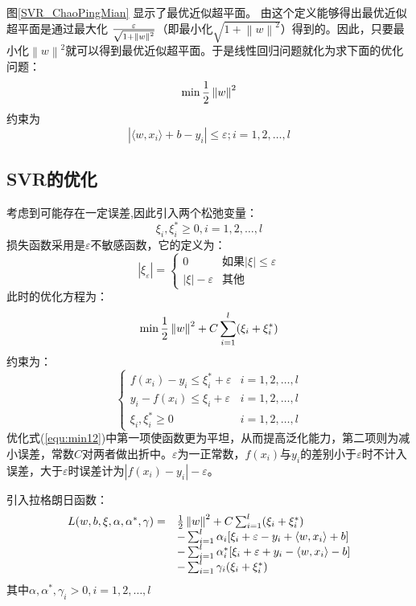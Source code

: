 图\ref{SVR_ChaoPingMian} 显示了最优近似超平面。
由这个定义能够得出最优近似超平面是通过最大化 ${\varepsilon \over \sqrt{ 1+ \left\| w \right\| ^2 }}$（即最小化$\sqrt{ 1+ \left\| w \right\| ^2 }$）得到的。因此，只要最小化$\left\| w \right\| ^2$就可以得到最优近似超平面。于是线性回归问题就化为求下面的优化问题：
\begin{equation}
	\min {1\over 2} \left\| w \right\| ^2
\end{equation}
约束为
\begin{equation}
	\left| \langle w,x_i \rangle +b -y_i \right| \leqslant \varepsilon; i = 1,2,\dots,l
\end{equation}

\subsection{SVR的优化}
考虑到可能存在一定误差,因此引入两个松弛变量：
$$ \xi_i,\xi_i^* \geqslant 0, i=1,2,\dots,l $$
损失函数采用是$\varepsilon$不敏感函数，它的定义为：
$$
	\left| \xi_\varepsilon \right|  = \left\lbrace 
		\begin{array}{cl}
		0 &  \text{如果}\left| \xi \right| \leqslant \varepsilon  \\
		\left| \xi \right| - \varepsilon & \text{其他}
		\end{array}
	 \right. 
$$
此时的优化方程为：
\begin{equation}
\label{equ:min12}
	\min {1\over 2} \left\| w \right\| ^2 +C\sum_{i=1}^{l} (\xi_i+\xi_i^*)
\end{equation}
约束为：
\begin{equation}
	 \left\lbrace 
		\begin{array}{ll}
		f(x_i)-y_i\leqslant \xi_i^*+\varepsilon &  i=1,2,\dots,l  \\
		y_i-f(x_i)\leqslant \xi_i+\varepsilon &  i=1,2,\dots,l\\
		\xi_i,\xi_i^*\geqslant 0 & i=1,2,\dots,l
		\end{array}
	\right. 
\end{equation}
优化式(\ref{equ:min12})中第一项使函数更为平坦，从而提高泛化能力，第二项则为减小误差，常数$C$对两者做出折中。$\varepsilon$为一正常数，$f(x_i)$与$y_i$的差别小于$\varepsilon$时不计入误差，大于$\varepsilon$时误差计为$\left| f(x_i)-y_i \right| -\varepsilon$。

引入拉格朗日函数：
$$
\begin{array}{cl}
L(w,b,\xi,\alpha,\alpha^*,\gamma) = & {1\over 2} \left\| w \right\| ^2 + C\sum_{i=1}^{l} (\xi_i+\xi_i^*) \\
{} & - \sum_{i=1}^{l}\alpha_i[\xi_i+\varepsilon-y_i+\langle w,x_i\rangle+b]\\
{} &  -\sum_{i=1}^{l}\alpha_i^*[\xi_i+\varepsilon+y_i-\langle w,x_i\rangle-b]\\
{} & -\sum_{i=1}^{l}\gamma_i(\xi_i+\xi_i^*)
\end{array}
$$
其中$\alpha,\alpha^*,\gamma_i>0,i=1,2,\dots,l$


